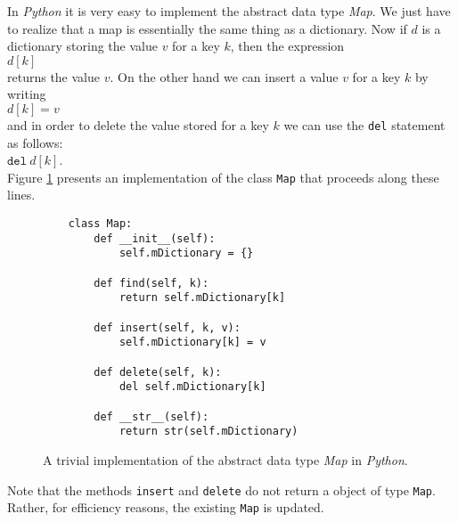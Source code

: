 In \textsl{Python} it is very easy to implement the abstract data type  \textsl{Map}.  We just have
to realize that a map is essentially the same thing as a dictionary.
Now if $d$ is a dictionary storing the value $v$ for a key $k$, then the expression
\\[0.2cm]
\hspace*{1.3cm} $d[k]$
\\[0.2cm]
returns the value $v$.  On the other hand we can insert a value $v$ for a key $k$ by
writing
\\[0.2cm]
\hspace*{1.3cm}
$d[k] = v$ 
\\[0.2cm]
and in order to delete the value stored for a key  $k$ we can use the \texttt{del} statement
as follows: \\[0.2cm]
\hspace*{1.3cm} $\texttt{del}\ d[k]$. \\[0.2cm]
Figure  \ref{fig:Map-Trivial.ipynb} presents an implementation of the class \texttt{Map} that proceeds along
these lines.


\begin{figure}[!ht]
  \centering
\begin{verbatim}
    class Map:
        def __init__(self):
            self.mDictionary = {}
        
        def find(self, k):
            return self.mDictionary[k]
        
        def insert(self, k, v):
            self.mDictionary[k] = v
            
        def delete(self, k):
            del self.mDictionary[k]
            
        def __str__(self):
            return str(self.mDictionary)
\end{verbatim}
\vspace*{-0.3cm}
  \caption{A trivial implementation of the abstract data type \textsl{Map} in \textsl{Python}.}
  \label{fig:Map-Trivial.ipynb}
\end{figure} 
Note that the methods \texttt{insert} and \texttt{delete} do not return a object of type \texttt{Map}.  Rather, for
efficiency reasons, the existing \texttt{Map} is updated.


